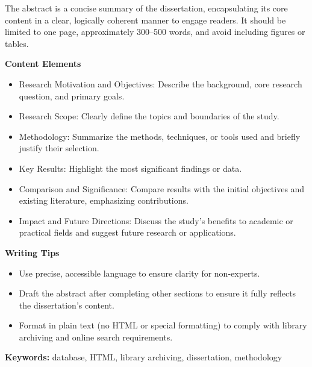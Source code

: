 	The abstract is a concise summary of the dissertation, encapsulating its core content in a clear, logically coherent manner to engage readers. It should be limited to one page, approximately 300–500 words, and avoid including figures or tables.
    
\textbf{Content Elements}
\begin{itemize}
    \item Research Motivation and Objectives: Describe the background, core research question, and primary goals.
    \item Research Scope: Clearly define the topics and boundaries of the study.
    \item Methodology: Summarize the methods, techniques, or tools used and briefly justify their selection.
    \item Key Results: Highlight the most significant findings or data.
    \item Comparison and Significance: Compare results with the initial objectives and existing literature, emphasizing contributions.
    \item Impact and Future Directions: Discuss the study’s benefits to academic or practical fields and suggest future research or applications.
\end{itemize}

\textbf{Writing Tips}
\begin{itemize}
    \item Use precise, accessible language to ensure clarity for non-experts.
    \item Draft the abstract after completing other sections to ensure it fully reflects the dissertation’s content.
    \item Format in plain text (no HTML or special formatting) to comply with library archiving and online search requirements.
\end{itemize}

\bigskip
\noindent\textbf{Keywords:} database, HTML, library archiving, dissertation, methodology